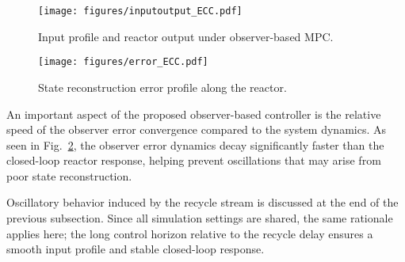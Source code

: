 \begin{figure}[htbp]
    \centering
    \texttt{[image: figures/inputoutput\_ECC.pdf]}
    \caption{Input profile and reactor output under observer-based MPC.}
    \label{fig:input_ECC}
\end{figure}

\begin{figure}[htbp]
    \centering
    \texttt{[image: figures/error\_ECC.pdf]}
    \caption{State reconstruction error profile along the reactor.}
    \label{fig:error_ECC}
\end{figure}

An important aspect of the proposed observer-based controller is the relative speed of the observer error convergence compared to the system dynamics. As seen in Fig.~\ref{fig:error_ECC}, the observer error dynamics decay significantly faster than the closed-loop reactor response, helping prevent oscillations that may arise from poor state reconstruction.

Oscillatory behavior induced by the recycle stream is discussed at the end of the previous subsection. Since all simulation settings are shared, the same rationale applies here; the long control horizon relative to the recycle delay ensures a smooth input profile and stable closed-loop response.
